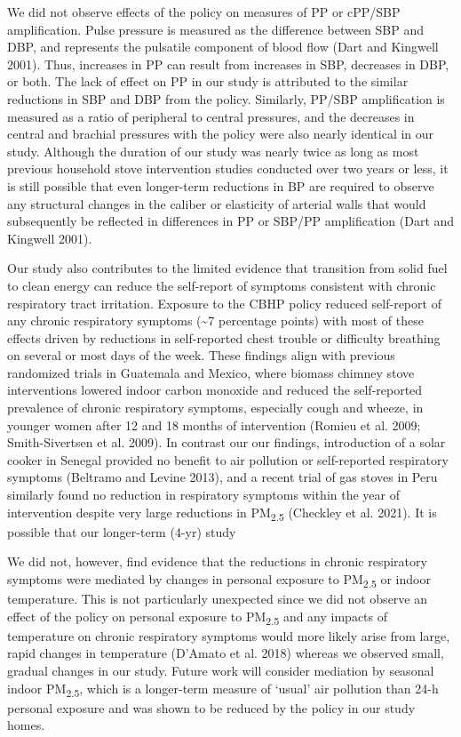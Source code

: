 \documentclass[
  letterpaper,
  DIV=11,
  numbers=noendperiod]{scrartcl}
\begin{document}
We did not observe effects of the policy on measures of PP or cPP/SBP
amplification. Pulse pressure is measured as the difference between SBP
and DBP, and represents the pulsatile component of blood flow (Dart and
Kingwell 2001). Thus, increases in PP can result from increases in SBP,
decreases in DBP, or both. The lack of effect on PP in our study is
attributed to the similar reductions in SBP and DBP from the policy.
Similarly, PP/SBP amplification is measured as a ratio of peripheral to
central pressures, and the decreases in central and brachial pressures
with the policy were also nearly identical in our study. Although the
duration of our study was nearly twice as long as most previous
household stove intervention studies conducted over two years or less,
it is still possible that even longer-term reductions in BP are required
to observe any structural changes in the caliber or elasticity of
arterial walls that would subsequently be reflected in differences in PP
or SBP/PP amplification (Dart and Kingwell 2001).

Our study also contributes to the limited evidence that transition from
solid fuel to clean energy can reduce the self-report of symptoms
consistent with chronic respiratory tract irritation. Exposure to the
CBHP policy reduced self-report of any chronic respiratory symptoms
(\textasciitilde7 percentage points) with most of these effects driven
by reductions in self-reported chest trouble or difficulty breathing on
several or most days of the week. These findings align with previous
randomized trials in Guatemala and Mexico, where biomass chimney stove
interventions lowered indoor carbon monoxide and reduced the
self-reported prevalence of chronic respiratory symptoms, especially
cough and wheeze, in younger women after 12 and 18 months of
intervention (Romieu et al. 2009; Smith-Sivertsen et al. 2009). In
contrast our our findings, introduction of a solar cooker in Senegal
provided no benefit to air pollution or self-reported respiratory
symptoms (Beltramo and Levine 2013), and a recent trial of gas stoves in
Peru similarly found no reduction in respiratory symptoms within the
year of intervention despite very large reductions in
PM\textsubscript{2.5} (Checkley et al. 2021). It is possible that our
longer-term (4-yr) study

We did not, however, find evidence that the reductions in chronic
respiratory symptoms were mediated by changes in personal exposure to
PM\textsubscript{2.5} or indoor temperature. This is not particularly
unexpected since we did not observe an effect of the policy on personal
exposure to PM\textsubscript{2.5} and any impacts of temperature on
chronic respiratory symptoms would more likely arise from large, rapid
changes in temperature (D'Amato et al. 2018) whereas we observed small,
gradual changes in our study. Future work will consider mediation by
seasonal indoor PM\textsubscript{2.5}, which is a longer-term measure of
`usual' air pollution than 24-h personal exposure and was shown to be
reduced by the policy in our study homes.
\end{document}
